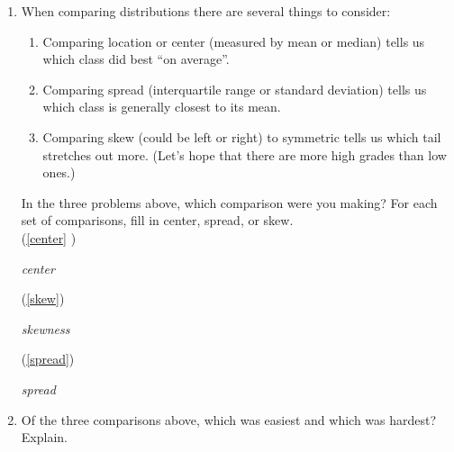 \begin{enumerate}
  \item  When comparing distributions there are several things to consider:
    \begin{enumerate}
    \item  Comparing location or center (measured by mean or median)
      tells us which class did best ``on average''. 
    \item  Comparing spread (interquartile range or standard
      deviation) tells us which class is generally closest to its mean.
    \item  Comparing skew (could be left or right) to symmetric tells
      us which tail stretches out more.
      (Let's hope that there are more high grades than low ones.) 
    \end{enumerate}
    In the three problems above, which comparison were you making?
    For each set of comparisons, fill in center, spread, or skew. \\
    (\ref{center} )
\begin{students}
\underline{\hspace*{3cm}}\hfill 
\end{students}
\begin{key}
  \underline{\hspace*{1cm}}  {\it  center} \underline{\hspace*{1cm}}\hfill 
\end{key} 
    (\ref{skew}) 
\begin{students}
   \underline{\hspace*{3cm}}\hfill 
\end{students}
\begin{key}
  \underline{\hspace*{1cm}}  {\it  skewness} \underline{\hspace*{1cm}}\hfill 
\end{key}
    (\ref{spread}) 
\begin{students}
  \underline{\hspace*{3cm}}\hfill 
\end{students}
\begin{key}
  \underline{\hspace*{1cm}}  {\it spread} \underline{\hspace*{1cm}}\hfill 
\end{key}
  \item   Of the three comparisons above, which was easiest and which
    was hardest? Explain. 
\begin{students}
    \vspace{2cm}    
\end{students}


\end{enumerate}
